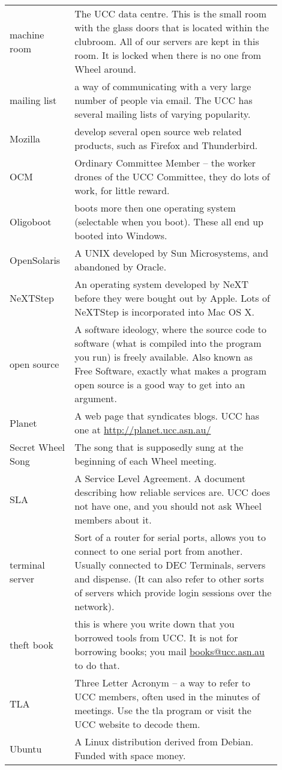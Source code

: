 {\begin{tabular}{p{0.2\linewidth}|p{0.7\linewidth}}
machine room &
The UCC data centre. This is the small room with the glass doors that is located within the clubroom. All of our servers are kept in this room. It is locked when there is no one from Wheel around. \\
mailing list &
a way of communicating with a very large number of people via email. The UCC has several mailing lists of varying popularity. \\
Mozilla &
develop several open source web related products, such as Firefox and Thunderbird. \\
OCM &
Ordinary Committee Member -- the worker drones of the UCC Committee, they do lots of work, for little reward. \\
Oligoboot &
boots more then one operating system (selectable when you boot). These all end up booted into Windows. \\
OpenSolaris &
A UNIX developed by Sun Microsystems, and abandoned by Oracle. \\
NeXTStep &
An operating system developed by NeXT before they were bought out by Apple. Lots of NeXTStep is incorporated into Mac OS X. \\
open source &
A software ideology, where the source code to software (what is compiled into the program you run) is freely available. Also known as Free Software, exactly what makes a program open source is a good way to get into an argument. \\
Planet &
A web page that syndicates blogs. UCC has one at \url{http://planet.ucc.asn.au/} \\
Secret Wheel Song &
The song that is supposedly sung at the beginning of each Wheel meeting. \\ %
SLA &
A Service Level Agreement. A document describing how reliable services are. UCC does not have one, and you should not ask Wheel members about it. \\
terminal server &
Sort of a router for serial ports, allows you to connect to one serial port from another. Usually connected to DEC Terminals, servers and dispense. (It can also refer to other sorts of servers which provide login sessions over the network). \\
theft book &
this is where you write down that you borrowed tools from UCC. It is not for borrowing books; you mail \href{mailto:books@ucc.asn.au}{books@ucc.asn.au} to do that. \\
TLA &
Three Letter Acronym -- a way to refer to UCC members, often used in the minutes of meetings. Use the tla program or visit the UCC website to decode them. \\
Ubuntu &
A Linux distribution derived from Debian. Funded with space money. \\
\end{tabular}

}
